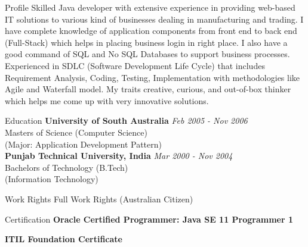 \documentclass{resume}
\begin{document}
\begin{rSection}{Profile}
Skilled Java developer with extensive experience in providing web-based IT solutions to various kind of businesses dealing in manufacturing and trading. I have complete knowledge of application components from front end to back end (Full-Stack) which helps in placing business login in right place. I also have a good command of SQL and No SQL Databases to support business processes. Experienced in SDLC (Software Development Life Cycle) that includes Requirement Analysis, Coding, Testing, Implementation with methodologies like Agile and Waterfall model. My traits creative, curious, and out-of-box thinker which helps me come up with very innovative solutions. 
\end{rSection}

\begin{rSection}{Education}
{\bf University of South Australia} \hfill {\em  Feb 2005 - Nov 2006} 
\\ Masters of Science (Computer Science)
\\(Major: Application Development Pattern)\\

{\bf Punjab Technical University, India} \hfill {\em  Mar 2000 - Nov 2004} 
\\ Bachelors of Technology (B.Tech)
\\ (Information Technology)

\end{rSection}

\begin{rSection}{Work Rights}
Full Work Rights (Australian Citizen)

\end{rSection}

\begin{rSection}{Certification}
{\bf Oracle Certified Programmer: Java SE 11 Programmer 1} 

{\bf ITIL Foundation Certificate} 

\end{rSection}
\end{document}
